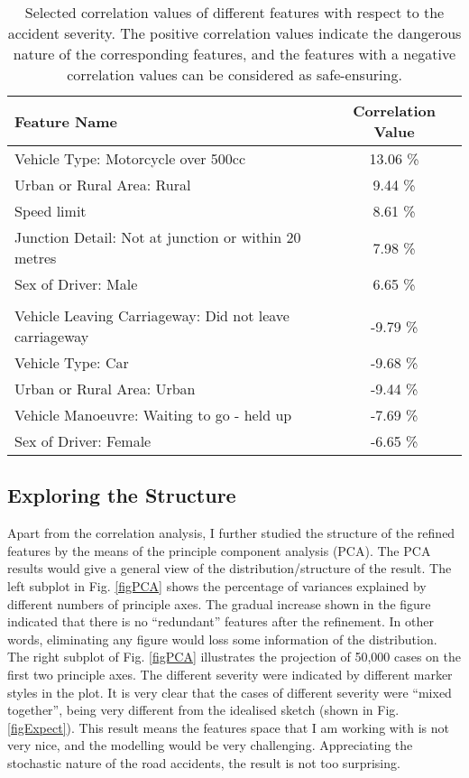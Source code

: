 \documentclass[12pt,a4paper]{article}
\begin{document}
\begin{table}[t]
\caption{Selected correlation values of different features with respect to the accident severity. The positive correlation values indicate the dangerous nature of the corresponding features, and the features with a negative correlation values can be considered as safe-ensuring.}
\label{tbCorr}
    \centering
    \begin{tabular}{  l c  }
        \toprule
        Feature Name & Correlation Value\\[0.5em]
        \toprule
        Vehicle Type: Motorcycle over 500cc  & 13.06 \%  \\
        Urban or Rural Area: Rural & 9.44 \% \\
        Speed limit & 8.61 \% \\
        Junction Detail: Not at junction or within 20 metres & 7.98 \% \\
        Sex of Driver: Male & 6.65 \% \\[0.2em]
        \hline \\[-0.8em]
        Vehicle Leaving Carriageway: Did not leave carriageway & -9.79 \% \\
        Vehicle Type: Car & -9.68 \% \\
        Urban or Rural Area: Urban & -9.44 \% \\
        Vehicle Manoeuvre: Waiting to go - held up & -7.69 \% \\
        Sex of Driver: Female & -6.65 \% \\
        \toprule
    \end{tabular}
\end{table}

\subsection{Exploring the Structure}

Apart from the correlation analysis, I further studied the structure of the refined features by the means of the principle component analysis (PCA). The PCA results would give a general view of the distribution/structure of the result. The left subplot in Fig. \ref{figPCA} shows the percentage of variances explained by different numbers of principle axes. The gradual increase shown in the figure indicated that there is no ``redundant'' features after the refinement. In other words, eliminating any figure would loss some information of the distribution. The right subplot of Fig. \ref{figPCA} illustrates the projection of 50,000 cases on the first two principle axes. The different severity were indicated by different marker styles in the plot. It is very clear that the cases of different severity were ``mixed together'', being very different from the idealised sketch (shown in Fig. \ref{figExpect}). This result means the features space that I am working with is not very nice, and the modelling would be very challenging. Appreciating the stochastic nature of the road accidents, the result is not too surprising.
\end{document}
